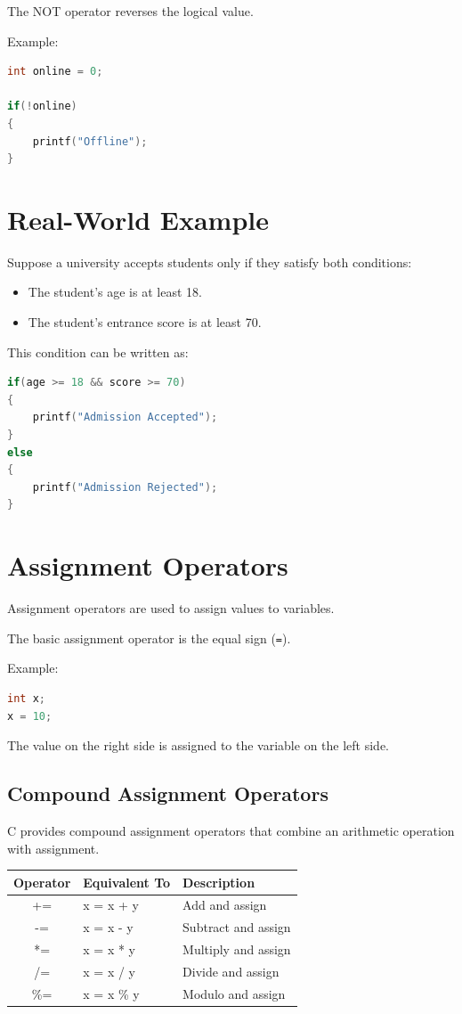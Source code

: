 \documentclass[12pt,openany]{book}
\begin{document}
The NOT operator reverses the logical value.

Example:

\begin{lstlisting}[language=C]
int online = 0;

if(!online)
{
    printf("Offline");
}
\end{lstlisting}

\section{Real-World Example}

Suppose a university accepts students only if they satisfy both conditions:

\begin{itemize}
\item The student's age is at least 18.
\item The student's entrance score is at least 70.
\end{itemize}

This condition can be written as:

\begin{lstlisting}[language=C]
if(age >= 18 && score >= 70)
{
    printf("Admission Accepted");
}
else
{
    printf("Admission Rejected");
}
\end{lstlisting}
\section{Assignment Operators}

Assignment operators are used to assign values to variables.

The basic assignment operator is the equal sign (\texttt{=}).

Example:

\begin{lstlisting}[language=C]
int x;
x = 10;
\end{lstlisting}

The value on the right side is assigned to the variable on the left side.

\subsection{Compound Assignment Operators}

C provides compound assignment operators that combine an arithmetic operation with assignment.

\begin{center}
\begin{tabular}{|c|l|l|}
\hline
\textbf{Operator} & \textbf{Equivalent To} & \textbf{Description} \\
\hline
+= & x = x + y & Add and assign \\
-= & x = x - y & Subtract and assign \\
*= & x = x * y & Multiply and assign \\
/= & x = x / y & Divide and assign \\
\%= & x = x \% y & Modulo and assign \\
\hline
\end{tabular}
\end{center}
\end{document}
